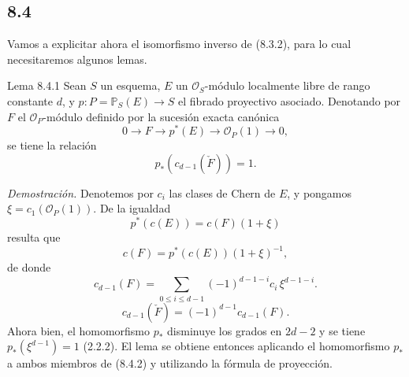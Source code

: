 \subsection*{8.4}

Vamos a explicitar ahora el isomorfismo inverso de (8.3.2), para lo cual necesitaremos algunos lemas.

\begin{statement}{Lema 8.4.1}
Sean $S$ un esquema, $E$ un $\mathcal O_S$-módulo localmente libre de rango constante $d$, y $p:P=\mathbb P_S(E)\to S$ el fibrado proyectivo asociado. Denotando por $F$ el $\mathcal O_P$-módulo definido por la sucesión exacta canónica
\[
0\to F\to p^*(E)\to\mathcal O_P(1)\to0,
\]
se tiene la relación
\[
p_*(c_{d-1}(\check F))=1.
\]
\end{statement}

\emph{Demostración.} Denotemos por $c_i$ las clases de Chern de $E$, y pongamos $\xi=c_1(\mathcal O_P(1))$. De la igualdad
\[
p^*(c(E))=c(F)(1+\xi)
\]
resulta que
\[
c(F)=p^*(c(E))(1+\xi)^{-1},
\]
de donde
\[
c_{d-1}(F)=\sum_{0\le i\le d-1}(-1)^{d-1-i}c_i\,\xi^{d-1-i}.
\tag{8.4.2}
\]
\[
c_{d-1}(\check F)=(-1)^{d-1}c_{d-1}(F).
\]
Ahora bien, el homomorfismo $p_*$ disminuye los grados en $2d-2$ y se tiene $p_*(\xi^{d-1})=1$ (2.2.2). El lema se obtiene entonces aplicando el homomorfismo $p_*$ a ambos miembros de (8.4.2) y utilizando la fórmula de proyección.
